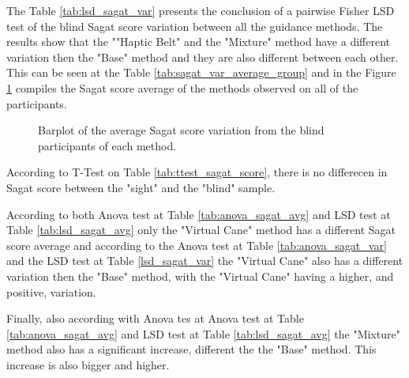 

The Table \ref{tab:lsd_sagat_var} presents the conclusion of a pairwise Fisher LSD test of the blind Sagat score variation between all the guidance methods. The results show that the ""Haptic Belt" and the "Mixture" method have a different variation then the "Base" method and they are also different between each other. This can be seen at the Table \ref{tab:sagat_var_average_group} and in the Figure \ref{fig:barplot_sagat_var_scene_blind} compiles the Sagat score average of the methods observed on all of the participants.





\begin{figure}[!htb]
    \centering
    \resizebox{0.6\linewidth}{!}{
    
    }
    \caption{Barplot of the average Sagat score variation from the blind participants of each method.}
    \label{fig:barplot_sagat_var_scene_blind}
\end{figure}

According to T-Test on Table \ref{tab:ttest_sagat_score}, there is no differecen in Sagat score between the "sight" and the "blind" sample.

According to both Anova test at Table \ref{tab:anova_sagat_avg} and LSD test at Table \ref{tab:lsd_sagat_avg} only the "Virtual Cane" method has a different Sagat score average and according to the Anova test at Table \ref{tab:anova_sagat_var} and the LSD test at Table \ref{lsd_sagat_var} the "Virtual Cane" also has a different variation then the "Base" method, with the "Virtual Cane" having a higher, and positive, variation.


Finally, also according with Anova tes at Anova test at Table \ref{tab:anova_sagat_avg} and LSD test at Table \ref{tab:lsd_sagat_avg} the "Mixture" method also has a significant increase, different the the "Base" method. This increase is also bigger and higher.

\FloatBarrier